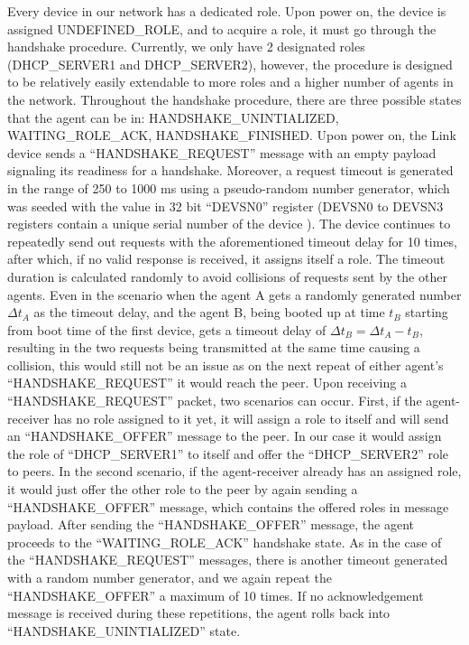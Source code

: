 Every device in our network has a dedicated role. Upon power on, the device is assigned UNDEFINED\_ROLE, and to acquire a role, it must go through the handshake procedure. Currently, we only have 2 designated roles (DHCP\_SERVER1 and DHCP\_SERVER2), however, the procedure is designed to be relatively easily extendable to more roles and a higher number of agents in the network. Throughout the handshake procedure, there are three possible states that the agent can be in: HANDSHAKE\_UNINTIALIZED, WAITING\_ROLE\_ACK, HANDSHAKE\_FINISHED.  Upon power on, the Link device sends a “HANDSHAKE\_REQUEST” message with an empty payload signaling its readiness for a handshake. Moreover, a request timeout is generated in the range of 250 to 1000 ms using a pseudo-random number generator, which was seeded with the value in 32 bit “DEVSN0” register (DEVSN0 to DEVSN3 registers contain a unique serial number of the device \cite{pic-datasheet}). The device continues to repeatedly send out requests with the aforementioned timeout delay for 10 times, after which, if no valid response is received, it assigns itself a role. The timeout duration is calculated randomly to avoid collisions of requests sent by the other agents. Even in the scenario when the agent A gets a randomly generated number \(\Delta t_A\) as the timeout delay, and the agent B, being booted up at time \(t_B\)  starting from boot time of the first device, gets a timeout delay of \(\Delta t_B = \Delta t_A - t_B\), resulting in the two requests being transmitted at the same time causing a collision, this would still not be an issue as on the next repeat of either agent’s “HANDSHAKE\_REQUEST” it would reach the peer. Upon receiving a “HANDSHAKE\_REQUEST” packet, two scenarios can occur. First, if the agent-receiver has no role assigned to it yet, it will assign a role to itself and will send an “HANDSHAKE\_OFFER” message to the peer. In our case it would assign the role of “DHCP\_SERVER1” to itself and offer the “DHCP\_SERVER2” role to peers. In the second scenario, if the agent-receiver already has an assigned role, it would just offer the other role to the peer by again sending a “HANDSHAKE\_OFFER” message, which contains the offered roles in message payload.
After sending the “HANDSHAKE\_OFFER” message, the agent proceeds to the “WAITING\_ROLE\_ACK” handshake state. As in the case of the “HANDSHAKE\_REQUEST” messages, there is another timeout generated with a random number generator, and we again repeat the “HANDSHAKE\_OFFER” a maximum of 10 times. If no acknowledgement message is received during these repetitions, the agent rolls back into “HANDSHAKE\_UNINTIALIZED” state.
